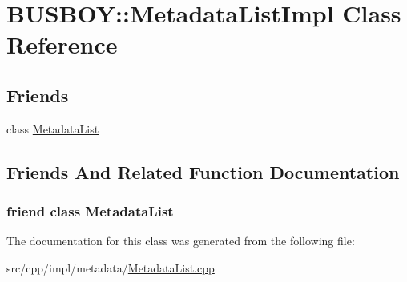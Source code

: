 \hypertarget{classBUSBOY_1_1MetadataListImpl}{
\section{BUSBOY::MetadataListImpl Class Reference}
\label{classBUSBOY_1_1MetadataListImpl}
}
\subsection*{Friends}
\begin{DoxyCompactItemize}
\item 
class \hyperlink{classBUSBOY_1_1MetadataListImpl_a9e38367a4f988647f5b28f36dcb36392}{MetadataList}
\end{DoxyCompactItemize}


\subsection{Friends And Related Function Documentation}
\hypertarget{classBUSBOY_1_1MetadataListImpl_a9e38367a4f988647f5b28f36dcb36392}{
\subsubsection[{MetadataList}]{\setlength{\rightskip}{0pt plus 5cm}friend class {\bf MetadataList}}}
\label{classBUSBOY_1_1MetadataListImpl_a9e38367a4f988647f5b28f36dcb36392}


The documentation for this class was generated from the following file:\begin{DoxyCompactItemize}
\item 
src/cpp/impl/metadata/\hyperlink{MetadataList_8cpp}{MetadataList.cpp}\end{DoxyCompactItemize}
